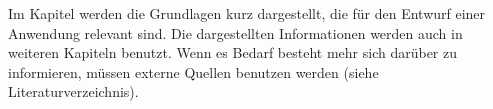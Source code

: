 Im Kapitel werden die Grundlagen kurz dargestellt, die für den Entwurf einer Anwendung relevant sind.
Die dargestellten Informationen werden auch in weiteren Kapiteln benutzt.
Wenn es Bedarf besteht mehr sich darüber zu informieren, müssen externe Quellen benutzen werden (siehe Literaturverzeichnis).